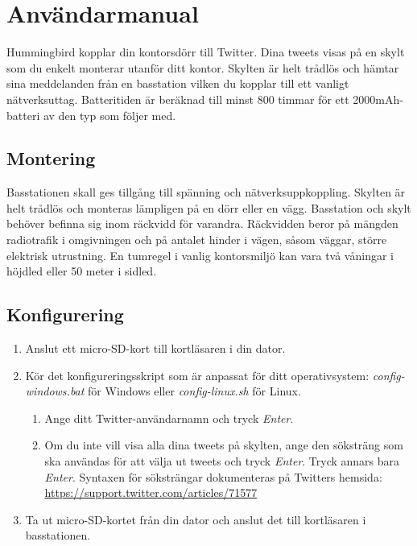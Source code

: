 \documentclass[a4paper,11pt]{article}
\begin{document}
\section{Användarmanual}

Hummingbird kopplar din kontorsdörr till Twitter. Dina tweets visas på en skylt som du enkelt monterar utanför ditt kontor. Skylten är helt trådlös och hämtar sina meddelanden från en basstation vilken du kopplar till ett vanligt nätverksuttag. Batteritiden är beräknad till minst 800 timmar för ett 2000mAh-batteri av den typ som följer med.

\subsection{Montering}
Basstationen skall ges tillgång till spänning och nätverksuppkoppling. Skylten är helt trådlös och monteras lämpligen på en dörr eller en vägg. Basstation och skylt behöver befinna sig inom räckvidd för varandra. Räckvidden beror på mängden radiotrafik i omgivningen och på antalet hinder i vägen, såsom väggar, större elektrisk utrustning. En tumregel i vanlig kontorsmiljö kan vara två våningar i höjdled eller 50 meter i sidled.

\subsection{Konfigurering}

\begin{enumerate}
    \item Anslut ett micro-SD-kort till kortläsaren i din dator.
    \item Kör det konfigureringsskript som är anpassat för ditt operativsystem: {\it config-windows.bat} för Windows eller {\it config-linux.sh} för Linux.
    \begin{enumerate}
        \item Ange ditt Twitter-användarnamn och tryck {\it Enter}.
        \item Om du inte vill visa alla dina tweets på skylten, ange den söksträng som ska användas för att välja ut tweets och tryck {\it Enter}. Tryck annars bara {\it Enter}. Syntaxen för söksträngar dokumenteras på Twitters hemsida: \url{https://support.twitter.com/articles/71577}
    \end{enumerate}
    \item Ta ut micro-SD-kortet från din dator och anslut det till kortläsaren i basstationen.
\end{enumerate}
\end{document}
